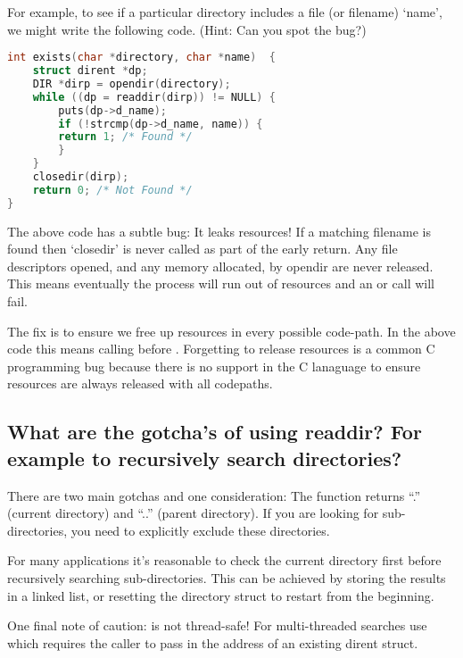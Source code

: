 For example, to see if a particular directory includes a file (or filename) `name', we might write the following code. (Hint: Can you spot the bug?)

\begin{lstlisting}[language=C]
int exists(char *directory, char *name)  {
    struct dirent *dp;
    DIR *dirp = opendir(directory);
    while ((dp = readdir(dirp)) != NULL) {
        puts(dp->d_name);
        if (!strcmp(dp->d_name, name)) {
        return 1; /* Found */
        }
    }
    closedir(dirp);
    return 0; /* Not Found */
}
\end{lstlisting}

The above code has a subtle bug: It leaks resources! If a matching filename is found then `closedir' is never called as part of the early return. Any file descriptors opened, and any memory allocated, by opendir are never released. This means eventually the process will run out of resources and an  or  call will fail.

The fix is to ensure we free up resources in every possible code-path. In the above code this means calling  before . Forgetting to release resources is a common C programming bug because there is no support in the C lanaguage to ensure resources are always released with all codepaths.

\subsection{What are the gotcha's of using readdir? For example to recursively search directories?}\label{what-are-the-gotchas-of-using-readdir-for-example-to-recursively-search-directories}

There are two main gotchas and one consideration: The  function returns ``.'' (current directory) and ``..'' (parent directory). If you are looking for sub-directories, you need to explicitly exclude these directories.

For many applications it's reasonable to check the current directory first before recursively searching sub-directories. This can be achieved by storing the results in a linked list, or resetting the directory struct to restart from the beginning.

One final note of caution:  is not thread-safe! For multi-threaded searches use  which requires the caller to pass in the address of an existing dirent struct.

